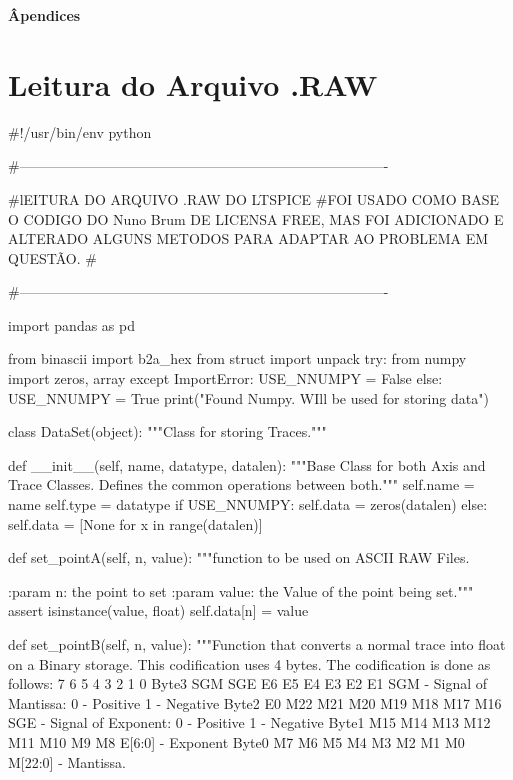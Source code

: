 \noindent\textbf{Âpendices}
$\!$\\

\section{\textbf{Leitura do Arquivo .RAW}}
\label{sec:CapLTspice}


#!/usr/bin/env python

#-------------------------------------------------------------------------------

#lEITURA DO ARQUIVO .RAW DO LTSPICE
#FOI USADO COMO BASE O CODIGO DO Nuno Brum DE LICENSA FREE, MAS FOI ADICIONADO E ALTERADO ALGUNS METODOS PARA ADAPTAR AO PROBLEMA EM QUESTÃO.
#

#-------------------------------------------------------------------------------




import pandas as pd

from binascii import b2a_hex
from struct import unpack
try:
    from numpy import zeros, array
except ImportError:
    USE_NNUMPY = False
else:
    USE_NNUMPY = True
    print("Found Numpy. WIll be used for storing data")


class DataSet(object):
    """Class for storing Traces."""

    def __init__(self, name, datatype, datalen):
        """Base Class for both Axis and Trace Classes.
        Defines the common operations between both."""
        self.name = name
        self.type = datatype
        if USE_NNUMPY:
            self.data = zeros(datalen)
        else:
            self.data = [None for x in range(datalen)]

    def set_pointA(self, n, value):
        """function to be used on ASCII RAW Files.

        :param n:     the point to set
        :param value: the Value of the point being set."""
        assert isinstance(value, float)
        self.data[n] = value

    def set_pointB(self, n, value):
        """Function that converts a normal trace into float on a Binary storage. This codification uses 4 bytes.
        The codification is done as follows:
               7   6   5   4     3   2   1   0
        Byte3  SGM SGE E6  E5    E4  E3  E2  E1         SGM - Signal of Mantissa: 0 - Positive 1 - Negative
        Byte2  E0  M22 M21 M20   M19 M18 M17 M16        SGE - Signal of Exponent: 0 - Positive 1 - Negative
        Byte1  M15 M14 M13 M12   M11 M10 M9  M8         E[6:0] - Exponent
        Byte0  M7  M6  M5  M4    M3  M2  M1  M0         M[22:0] - Mantissa.

